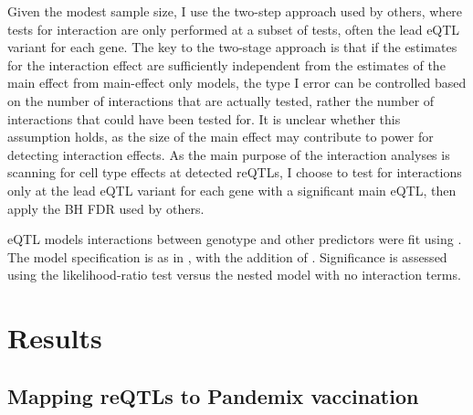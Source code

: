 Given the modest sample size, I use the two-step approach used by others\autocite{westra2015CellSpecificEQTL,peters2016InsightGenotypePhenotypeAssociations,kim-hellmuth2017GeneticRegulatoryEffects,davenport2018DiscoveringVivoCytokineeQTL},
where tests for interaction are only performed at a subset of tests, often the lead \gls{eQTL} variant for each gene.
%
%
The key to the two-stage approach is that if the estimates for the interaction effect are sufficiently independent from the estimates of the main effect from main-effect only models,
the type I error can be controlled based on the number of interactions that are actually tested, rather the number of interactions that could have been tested for\autocite{kooperberg2008IncreasingPowerIdentifying,peters2016InsightGenotypePhenotypeAssociations}.
It is unclear whether this assumption holds, as the size of the main effect may contribute to power for detecting interaction effects.
As the main purpose of the interaction analyses is scanning for cell type effects at detected \glspl{reQTL},
I choose to test for interactions only at the lead \gls{eQTL} variant for each gene with a significant main \gls{eQTL},
then apply the \gls{BH} \gls{FDR} used by others\autocite{peters2016InsightGenotypePhenotypeAssociations,kim-hellmuth2017GeneticRegulatoryEffects}.

\gls{eQTL} models interactions between genotype and other predictors were fit using .
The model specification is as in , with the addition of .
Significance is assessed using the likelihood-ratio test versus the nested model with no interaction terms.


\section{Results}

\subsection{Mapping reQTLs to Pandemix vaccination}

